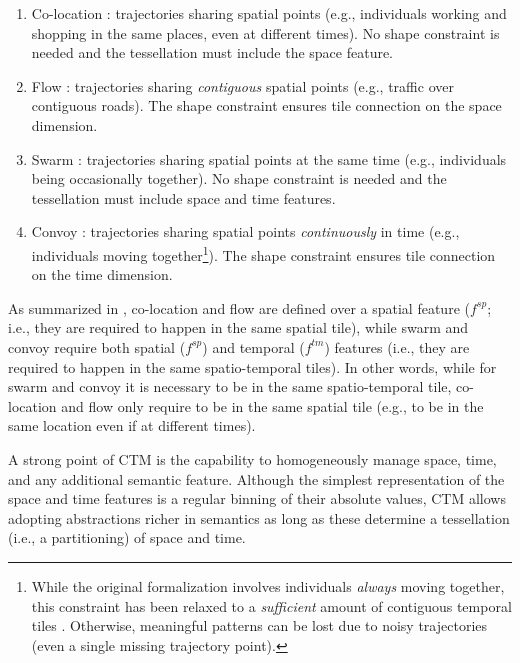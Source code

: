 \documentclass[
]{ceurart}
\begin{document}
\begin{enumerate}[label=(\alph*)]
    \item Co-location \citep{DBLP:journals/isci/FranciaGR20}: trajectories sharing spatial points (e.g., individuals working and shopping in the same places, even at different times). No shape constraint is needed and the tessellation must include the space feature.
    \item Flow \citep{DBLP:journals/tmc/HanLO15}: trajectories sharing \textit{contiguous} spatial points (e.g., traffic over contiguous roads).
    The shape constraint ensures tile connection on the space dimension.
    \item Swarm \citep{DBLP:journals/pvldb/LiDHK10}: trajectories sharing spatial points at the same time (e.g., individuals being occasionally together). No shape constraint is needed and the tessellation must include space and time features.
    \item Convoy \citep{DBLP:journals/pvldb/JeungYZJS08}: trajectories sharing spatial points \textit{continuously} in time (e.g., individuals moving together\footnote{While the original formalization involves individuals \textit{always} moving together, this constraint has been relaxed to a \textit{sufficient} amount of contiguous temporal tiles \citep{DBLP:journals/pvldb/FanZWT16}. Otherwise, meaningful patterns can be lost due to noisy trajectories (even a single missing trajectory point).}). The shape constraint ensures tile connection on the time dimension.
\end{enumerate}

As summarized in , co-location and flow are defined over a spatial feature ($f^{sp}$; i.e., they are required to happen in the same spatial tile), while swarm and convoy require both spatial ($f^{sp}$) and temporal ($f^{tm}$) features (i.e., they are required to happen in the same spatio-temporal tiles).
In other words, while for swarm and convoy it is necessary to be in the same spatio-temporal tile, co-location and flow only require to be in the same spatial tile (e.g., to be in the same location even if at different times).

A strong point of CTM is the capability to homogeneously manage space, time, and any additional semantic feature.
Although the simplest representation of the space and time features is a regular binning of their absolute values, CTM allows adopting abstractions richer in semantics as long as these determine a tessellation (i.e., a partitioning) of space and time.
\end{document}

